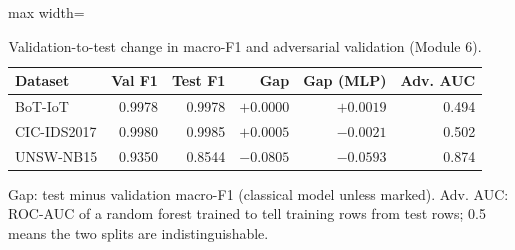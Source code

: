 \begin{table}[t]
\centering
\caption{Validation-to-test change in macro-F1 and adversarial validation (Module 6).}
\label{tab:generalisation}
\footnotesize
\setlength{\tabcolsep}{3.5pt}
\begin{adjustbox}{max width=\linewidth}
\begin{tabular}{lrrrrr}
\toprule
Dataset & Val F1 & Test F1 & Gap & Gap (MLP) & Adv. AUC \\
\midrule
BoT-IoT & 0.9978 & 0.9978 & $+0.0000$ & $+0.0019$ & 0.494 \\
CIC-IDS2017 & 0.9980 & 0.9985 & $+0.0005$ & $-0.0021$ & 0.502 \\
UNSW-NB15 & 0.9350 & 0.8544 & $-0.0805$ & $-0.0593$ & 0.874 \\
\bottomrule
\end{tabular}
\end{adjustbox}
\par\vspace{2pt}
\parbox{0.98\linewidth}{\scriptsize Gap: test minus validation macro-F1 (classical model unless marked). Adv. AUC: ROC-AUC of a random forest trained to tell training rows from test rows; 0.5 means the two splits are indistinguishable.}
\end{table}
